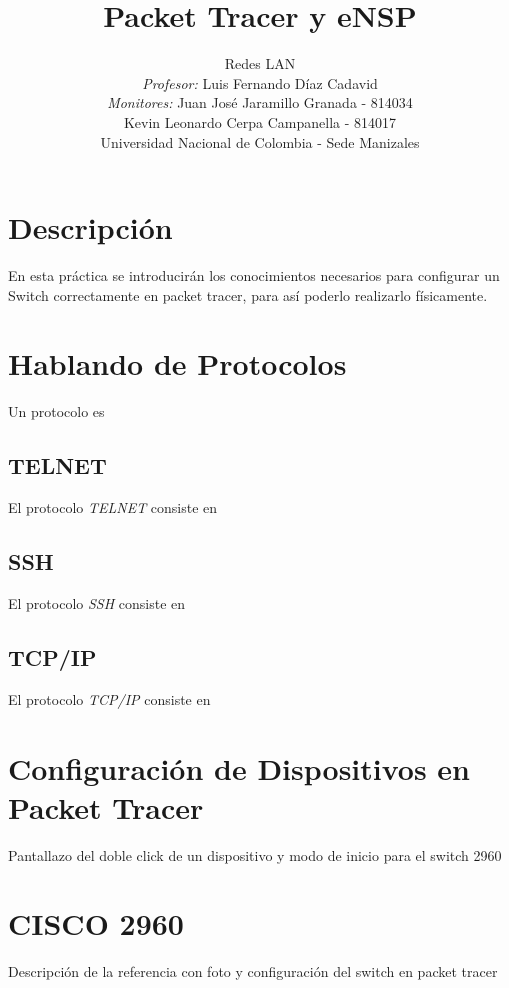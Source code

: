 \documentclass[journal]{IEEEtran}
\title{\textbf{Packet Tracer y eNSP}}
\author{Redes LAN \\
	\textit{Profesor:} Luis Fernando Díaz Cadavid\\ 
	\textit{Monitores:} Juan José Jaramillo Granada - 814034 \\
	Kevin Leonardo Cerpa Campanella - 814017 \\
	Universidad Nacional de Colombia - Sede Manizales}
\date{}
\begin{document}
\maketitle

\section{Descripción}
En esta práctica se introducirán los conocimientos necesarios para configurar un Switch correctamente en packet tracer, para así poderlo realizarlo físicamente.

\section{Hablando de Protocolos}
Un protocolo es
	\subsection{TELNET}
	El protocolo \textit{TELNET} consiste en
	\subsection{SSH}
	El protocolo \textit{SSH} consiste en
	\subsection{TCP/IP}
	El protocolo \textit{TCP/IP} consiste en
	
\section{Configuración de Dispositivos en Packet Tracer}
Pantallazo del doble click de un dispositivo y modo de inicio para el switch 2960

\section{CISCO 2960}
Descripción de la referencia con foto y  configuración del switch en packet tracer
	
\end{document}
